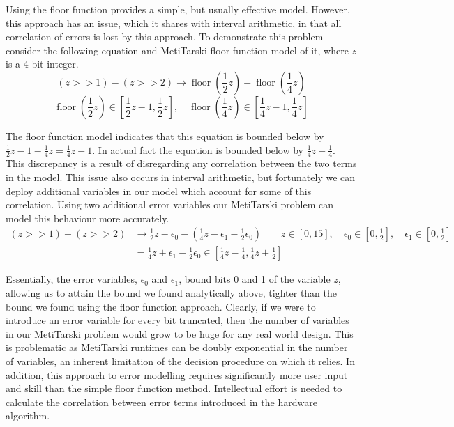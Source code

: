 \documentclass{fac}
\newcommand{\floor}{\mathop{\textrm{floor}}\nolimits}
\begin{document}
Using the floor function provides a simple, but usually effective model. However, this approach has an issue, which it shares with interval arithmetic, in that all correlation of errors is lost by this approach. To demonstrate this problem consider the following equation and MetiTarski floor function model of it, where $z$ is a 4 bit integer.
\[
(z>>1) - (z>>2) \rightarrow  \floor(\frac{1}{2}z) - \floor(\frac{1}{4}z)
\]
\[
\floor(\frac{1}{2}z) \in [\frac{1}{2}z-1, \frac{1}{2}z], \quad \floor(\frac{1}{4}z) \in [\frac{1}{4}z-1,\frac{1}{4}z]
\]

The floor function model indicates that this equation is bounded below by $\frac{1}{2}z - 1 - \frac{1}{4}z = \frac{1}{4}z - 1$. In actual fact the equation is bounded below by $\frac{1}{4}z - \frac{1}{4}$. This discrepancy is a result of disregarding any correlation between the two terms in the model. This issue also occurs in interval arithmetic, but fortunately we can deploy additional variables in our model which account for some of this correlation. Using two additional error variables our MetiTarski problem can model this behaviour more accurately.
\begin{align*}
(z>>1) - (z>>2) &\rightarrow \frac{1}{2}z - \epsilon_0 - (\frac{1}{4}z - \epsilon_1 - \frac{1}{2}\epsilon_0) \qquad z \in [0,15], \quad \epsilon_0 \in [0,\frac{1}{2}], \quad \epsilon_1 \in [0,\frac{1}{2}] \\   
                &=           \frac{1}{4}z + \epsilon_1 - \frac{1}{2}\epsilon_0 \in [\frac{1}{4}z - \frac{1}{4}, \frac{1}{4}z + \frac{1}{2}]
\end{align*}

Essentially, the error variables, $\epsilon_0$ and $\epsilon_1$, bound bits 0 and 1 of the variable $z$, allowing us to attain the bound we found analytically above, tighter than the bound we found using the floor function approach. Clearly, if we were to introduce an error variable for every bit truncated, then the number of variables in our MetiTarski problem would grow to be huge for any real world design. This is problematic as MetiTarski runtimes can be doubly exponential in the number of variables, an inherent limitation of the decision procedure on which it relies. In addition, this approach to error modelling requires significantly more user input and skill than the simple floor function method. Intellectual effort is needed to calculate the correlation between error terms introduced in the hardware algorithm.
\end{document}
